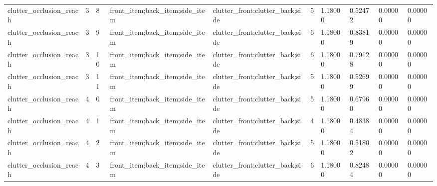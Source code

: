 \documentclass{article}
\begin{document}
\begin{table}[tbp]
{\begin{tabular}{llllllllll}
clutter\_occlusion\_reach & 3 & 8 & front\_item;back\_item;side\_item & clutter\_front;clutter\_back;side & 5 & 1.18000 & 0.52472 & 0.00000 & 0.00000 \\
clutter\_occlusion\_reach & 3 & 9 & front\_item;back\_item;side\_item & clutter\_front;clutter\_back;side & 6 & 1.18000 & 0.83819 & 0.00000 & 0.00000 \\
clutter\_occlusion\_reach & 3 & 10 & front\_item;back\_item;side\_item & clutter\_front;clutter\_back;side & 6 & 1.18000 & 0.79128 & 0.00000 & 0.00000 \\
clutter\_occlusion\_reach & 3 & 11 & front\_item;back\_item;side\_item & clutter\_front;clutter\_back;side & 5 & 1.18000 & 0.52699 & 0.00000 & 0.00000 \\
clutter\_occlusion\_reach & 4 & 0 & front\_item;back\_item;side\_item & clutter\_front;clutter\_back;side & 5 & 1.18000 & 0.67960 & 0.00000 & 0.00000 \\
clutter\_occlusion\_reach & 4 & 1 & front\_item;back\_item;side\_item & clutter\_front;clutter\_back;side & 4 & 1.18000 & 0.48384 & 0.00000 & 0.00000 \\
clutter\_occlusion\_reach & 4 & 2 & front\_item;back\_item;side\_item & clutter\_front;clutter\_back;side & 5 & 1.18000 & 0.51802 & 0.00000 & 0.00000 \\
clutter\_occlusion\_reach & 4 & 3 & front\_item;back\_item;side\_item & clutter\_front;clutter\_back;side & 6 & 1.18000 & 0.82484 & 0.00000 & 0.00000 \\
\bottomrule
\end{tabular}
}
\end{table}

\clearpage
\end{document}
